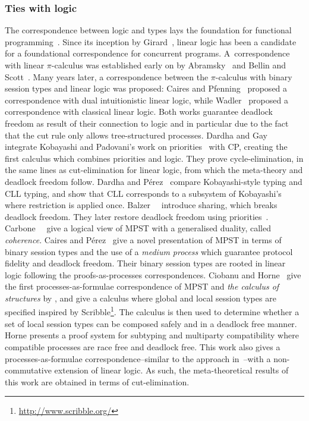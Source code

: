 \documentclass[main.tex]{subfiles}
\begin{document}
\subsubsection*{Ties with logic}
The correspondence between logic and types lays the foundation for functional programming~\cite{wadler15}. Since its inception by Girard~\cite{girard87}, linear logic has been a candidate for a foundational correspondence for concurrent programs. A~correspondence with linear $\pi$-calculus was established early on by Abramsky~\cite{abramsky94} and Bellin and Scott~\cite{bellinscott94}. Many years later, a correspondence between the $\pi$-calculus with binary session types and linear logic was proposed: Caires and Pfenning~\cite[$\pi\text{DILL}$]{cairespfenning10} proposed a correspondence with dual intuitionistic linear logic, while Wadler~\cite[CP]{wadler14} proposed a correspondence with classical linear logic. Both works guarantee deadlock freedom as result of their connection to logic and in particular due to the fact that the cut rule only allows tree-structured processes. Dardha and Gay~\cite[PCP]{dardhagay18} integrate Kobayashi and Padovani's work on priorities~\cite{kobayashi06,padovani14} with CP, creating the first calculus which combines priorities and logic. They prove cycle-elimination, in the same lines as cut-elimination for linear logic, from which the meta-theory and deadlock freedom follow. Dardha and P\'{e}rez~\cite{dardhaperez15} compare Kobayashi-style typing and CLL typing, and show that CLL corresponds to a subsystem of Kobayashi's where restriction is applied once. Balzer~\etal~\cite[$\text{SILL}_S$]{balzerpfenning17} introduce sharing, which breaks deadlock freedom. They later restore deadlock freedom using priorities~\cite[$\text{SILL}_{S+}$]{balzertoninho19}.
Carbone~\etal~\cite{CarboneMSY15,carbonelindley16} give a logical view of MPST with a generalised duality, called \emph{coherence}.
Caires and P\'{e}rez~\cite{CairesP16} give a novel presentation of MPST in terms of binary session types and the use of a \emph{medium process} which guarantee protocol fidelity and deadlock freedom. Their binary session types are rooted in linear logic following the proofs-as-processes correspondences.
Ciobanu and Horne~\cite{CiobanuH15} give the first processes-as-formulae correspondence of MPST and \emph{the calculus of structures} by \cite{Guglielmi07}, and give a calculus where global and local session types are specified inspired by Scribble\footnote{\url{http://www.scribble.org/}}. The calculus is then used to determine whether a set of local session types can be composed safely and in a deadlock free manner.
Horne \cite{Horne20} presents a proof system for subtyping and multiparty compatibility where compatible processes are race free and deadlock free. This work also gives a processes-as-formulae correspondence--similar to the approach in~\cite{CiobanuH15}--with a non-commutative extension of linear logic. As such, the meta-theoretical results of this work are obtained in terms of cut-elimination.
\end{document}
